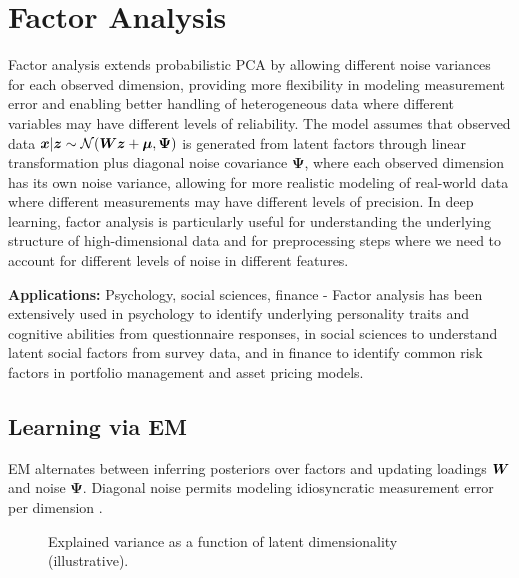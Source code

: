 
\section{Factor Analysis }
\label{sec:factor-analysis}

Factor analysis extends probabilistic PCA by allowing different noise variances for each observed dimension, providing more flexibility in modeling measurement error and enabling better handling of heterogeneous data where different variables may have different levels of reliability. The model assumes that observed data $\boldsymbol{x} | \boldsymbol{z} \sim \mathcal{N}(\boldsymbol{W}\boldsymbol{z} + \boldsymbol{\mu}, \boldsymbol{\Psi})$ is generated from latent factors through linear transformation plus diagonal noise covariance $\boldsymbol{\Psi}$, where each observed dimension has its own noise variance, allowing for more realistic modeling of real-world data where different measurements may have different levels of precision. In deep learning, factor analysis is particularly useful for understanding the underlying structure of high-dimensional data and for preprocessing steps where we need to account for different levels of noise in different features.

\textbf{Applications:} Psychology, social sciences, finance - Factor analysis has been extensively used in psychology to identify underlying personality traits and cognitive abilities from questionnaire responses, in social sciences to understand latent social factors from survey data, and in finance to identify common risk factors in portfolio management and asset pricing models.

\subsection{Learning via EM}

EM alternates between inferring posteriors over factors and updating loadings $\boldsymbol{W}$ and noise $\boldsymbol{\Psi}$. Diagonal noise permits modeling idiosyncratic measurement error per dimension \textcite{Bishop2006}.

\begin{figure}[h]
  \centering
  \caption{Explained variance as a function of latent dimensionality (illustrative).}
  \label{fig:fa-variance}
\end{figure}

